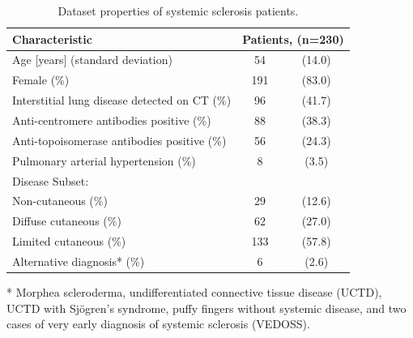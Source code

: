 \begin{table}[]
\centering
\caption{Dataset properties of systemic sclerosis patients.}
\label{table: data}
\begin{threeparttable}
\begin{tabular}{lcc}
\hline
\textbf{Characteristic}                       & \multicolumn{2}{c}{\textbf{Patients, (n=230)}} \\ \hline
Age {[}years{]} (standard deviation)          & 54                   & (14.0)                  \\
Female (\%)                                   & 191                  & (83.0)                  \\
Interstitial lung disease detected on CT (\%) & 96                   & (41.7)                  \\
Anti-centromere antibodies positive (\%)      & 88                   & (38.3)                  \\
Anti-topoisomerase antibodies positive (\%)   & 56                   & (24.3)                  \\
Pulmonary arterial hypertension (\%)          & 8                    & (3.5)                   \\
Disease Subset:                               &                      &                         \\
\hspace*{1em}Non-cutaneous (\%)                            & 29                   & (12.6)                  \\
\hspace*{1em}Diffuse cutaneous (\%)                        & 62                   & (27.0)                  \\
\hspace*{1em}Limited cutaneous (\%)                        & 133                  & (57.8)                  \\
\hspace*{1em}Alternative diagnosis* (\%)                   & 6                    & (2.6)                   \\ \hline
\end{tabular}
\begin{tablenotes}
\item[*] Morphea scleroderma, undifferentiated connective tissue disease (UCTD), UCTD with Sjögren's syndrome, puffy fingers without systemic disease, and two cases of very early diagnosis of systemic sclerosis (VEDOSS).
\end{tablenotes}
\end{threeparttable}
\end{table}

